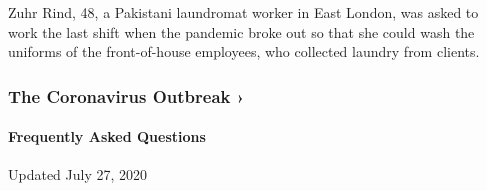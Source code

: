 Zuhr Rind, 48, a Pakistani laundromat worker in East London, was asked
to work the last shift when the pandemic broke out so that she could
wash the uniforms of the front-of-house employees, who collected laundry
from clients.

\href{https://www.nytimes.com/news-event/coronavirus?action=click\&pgtype=Article\&state=default\&region=MAIN_CONTENT_3\&context=storylines_faq}{}

\hypertarget{the-coronavirus-outbreak-}{%
\subsubsection{The Coronavirus Outbreak
›}\label{the-coronavirus-outbreak-}}

\hypertarget{frequently-asked-questions}{%
\paragraph{Frequently Asked
Questions}\label{frequently-asked-questions}}

Updated July 27, 2020

